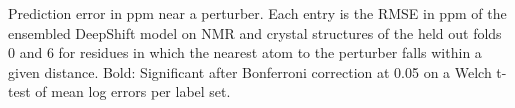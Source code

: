 Prediction error in ppm near a perturber. Each entry is the RMSE in ppm of the ensembled DeepShift model on NMR and crystal structures of the held out folds 0 and 6 for residues in which the nearest atom to the perturber falls within a given distance. Bold: Significant after Bonferroni correction at 0.05 on a Welch t-test of mean log errors per label set.
